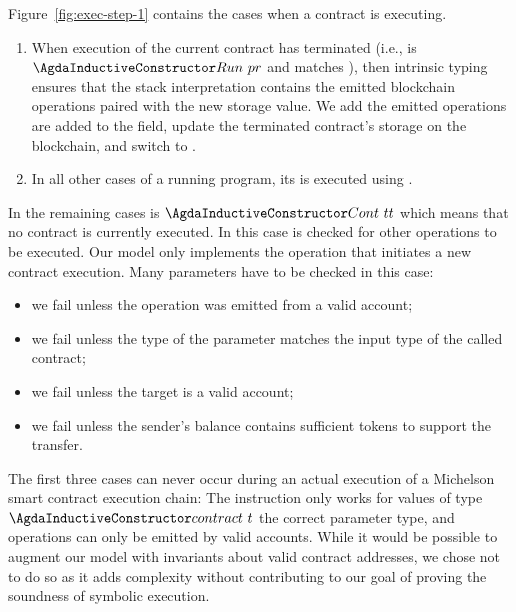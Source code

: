 Figure~\ref{fig:exec-step-1} contains the cases when a contract is executing.
\begin{enumerate}
\item When execution of the current contract has terminated
  (i.e.,  is $\ACon{Run}~pr$ and  matches ),
  then intrinsic typing ensures that  the stack interpretation contains the emitted blockchain operations
  paired with the new storage value.
  We add the emitted operations are added to the  field,
  update the terminated contract's storage on the blockchain, and
  switch to  . 
\item In all other cases of a running program, its  is executed using .
\end{enumerate}
In the remaining cases  is $\ACon{Cont}~tt$ which
means that no contract is currently executed. In this case
 is checked for other operations to be executed. 
Our model only implements the  operation
that initiates a new contract execution.
Many parameters have to be checked in this case:
\begin{itemize}
\item we fail unless the operation was emitted from a valid account;
\item we fail unless the type of the parameter matches the input type of the called contract;
\item we fail unless the target is a valid account;
\item we fail unless the sender's balance
  contains sufficient tokens to support the transfer.
\end{itemize}
The first three cases can never occur during an actual execution of
a Michelson smart contract execution chain:
The  instruction only works for values of type
$\Acontract~t$ the correct parameter type, and operations can only be
emitted by valid accounts.
While it would be possible to augment our model with invariants about
valid contract addresses, we chose not to do so as it adds complexity
without contributing to our goal of proving the soundness of symbolic
execution. 


